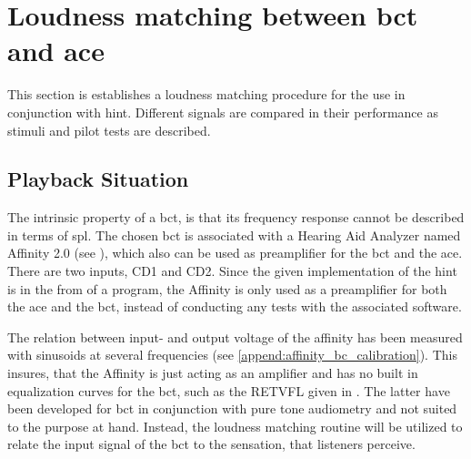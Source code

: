 
\section{Loudness matching between \gls{bct} and \gls{ace}}
\label{sec:loudness_match}
This section is establishes a loudness matching procedure for the use in conjunction with \gls{hint}. Different signals are compared in their performance as stimuli and pilot tests are described.


\subsection{Playback Situation}

The intrinsic property of a \gls{bct}, is that its frequency response cannot be described in terms of \gls{spl}.
The chosen \gls{bct} is associated with a Hearing Aid Analyzer named Affinity 2.0 (see \citep{affinity_20}), which also can be used as preamplifier for the \gls{bct} and the \gls{ace}. There are two inputs, CD1 and CD2. Since the given implementation of the \gls{hint} is in the from of a \matlab program, the Affinity is only used as a preamplifier for both the \gls{ace} and the \gls{bct}, instead of conducting any tests with the associated software.


The relation between input- and output voltage of the affinity has been measured with sinusoids at several frequencies (see \autoref{append:affinity_bc_calibration}).
This insures, that the Affinity is just acting as an amplifier and has no built in equalization curves for the \gls{bct}, such as the RETVFL given in \citep[Tab. 1]{iso_389-3}. The latter have been developed for \gls{bct} in conjunction with pure tone audiometry and not suited to the purpose at hand.
Instead, the loudness matching routine will be utilized to relate the input signal of the \gls{bct} to the sensation, that listeners perceive.


